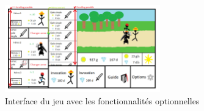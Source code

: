         \begin{figure}[ht!]
            \centering
                \includegraphics[width=0.6\textwidth]{images/TWJeuHUD.png}
            \caption{Interface du jeu avec les fonctionnalités optionnelles}
        \end{figure}
